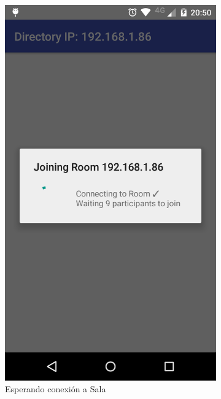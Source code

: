 \begin{figure}[H]
    \centering
    \begin{subfigure}[b]{0.4\textwidth}
        \includegraphics[width=\textwidth]{imagenes/mobile_connecting.png}
        \caption{Esperando conexión a Sala}
        \label{fig:mobile_waiting}
    \end{subfigure}
    ~
    \begin{subfigure}[b]{0.4\textwidth}

\end{subfigure}
\end{figure}
